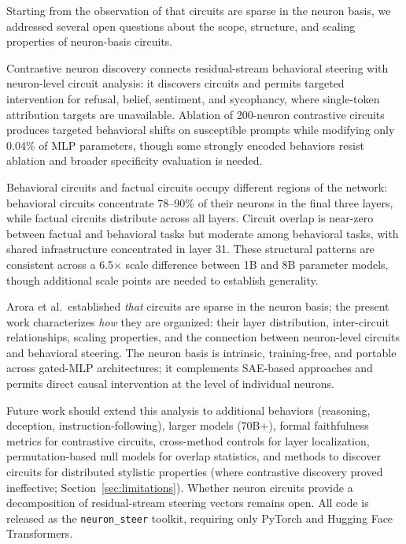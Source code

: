 \documentclass[11pt]{article}
\begin{document}
Starting from the observation of \citet{arora2025circuits} that circuits are sparse in the neuron basis, we addressed several open questions about the scope, structure, and scaling properties of neuron-basis circuits.

Contrastive neuron discovery connects residual-stream behavioral steering with neuron-level circuit analysis: it discovers circuits and permits targeted intervention for refusal, belief, sentiment, and sycophancy, where single-token attribution targets are unavailable.
Ablation of 200-neuron contrastive circuits produces targeted behavioral shifts on susceptible prompts while modifying only 0.04\% of MLP parameters, though some strongly encoded behaviors resist ablation and broader specificity evaluation is needed.

Behavioral circuits and factual circuits occupy different regions of the network: behavioral circuits concentrate 78--90\% of their neurons in the final three layers, while factual circuits distribute across all layers.
Circuit overlap is near-zero between factual and behavioral tasks but moderate among behavioral tasks, with shared infrastructure concentrated in layer 31.
These structural patterns are consistent across a 6.5$\times$ scale difference between 1B and 8B parameter models, though additional scale points are needed to establish generality.

Arora et al.\ established \emph{that} circuits are sparse in the neuron basis; the present work characterizes \emph{how} they are organized: their layer distribution, inter-circuit relationships, scaling properties, and the connection between neuron-level circuits and behavioral steering.
The neuron basis is intrinsic, training-free, and portable across gated-MLP architectures; it complements SAE-based approaches and permits direct causal intervention at the level of individual neurons.

Future work should extend this analysis to additional behaviors (reasoning, deception, instruction-following), larger models (70B+), formal faithfulness metrics for contrastive circuits, cross-method controls for layer localization, permutation-based null models for overlap statistics, and methods to discover circuits for distributed stylistic properties (where contrastive discovery proved ineffective; Section~\ref{sec:limitations}).
Whether neuron circuits provide a decomposition of residual-stream steering vectors remains open.
All code is released as the \texttt{neuron\_steer} toolkit, requiring only PyTorch and Hugging Face Transformers.
\end{document}
